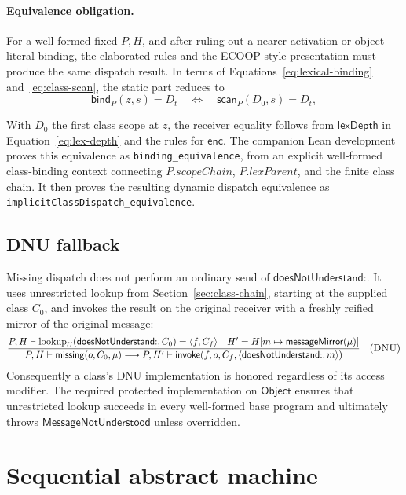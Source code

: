 \documentclass[11pt]{article}
\numberwithin{equation}{section}
\newcommand{\kw}[1]{\ensuremath{\mathsf{#1}}}
\newcommand{\Object}{\kw{Object}}
\newcommand{\lookup}{\mathop{\mathrm{lookup}}}
\newcommand{\kws}[1]{\ensuremath{\mathsf{#1\mathord{:}}}}
\newcommand{\dnu}{\kws{doesNotUnderstand}}
\newcommand{\rulelabel}[1]{\textsc{#1}}
\begin{document}
\paragraph{Equivalence obligation.}
For a well-formed fixed $P,H$, and after ruling out a nearer activation or
object-literal binding, the elaborated rules and the ECOOP-style presentation
must produce the same dispatch result.  In terms of
Equations~\eqref{eq:lexical-binding} and~\eqref{eq:class-scan}, the static part
reduces to
\begin{equation}\label{eq:binding-equivalence}
 \mathsf{bind}_P(z,s)=D_t
 \quad\Longleftrightarrow\quad
 \mathsf{scan}_P(D_0,s)=D_t,
\end{equation}
\begin{sloppypar}
With $D_0$ the first class scope at $z$, the receiver equality follows from
$\mathsf{lexDepth}$ in Equation~\eqref{eq:lex-depth} and the rules for
$\mathsf{enc}$.  The companion Lean development proves this equivalence as
\texttt{binding\_\allowbreak equivalence}, from an explicit well-formed class-binding
context connecting $P.\mathit{scopeChain}$, $P.\mathit{lexParent}$, and the
finite class chain.  It then proves the resulting dynamic dispatch
equivalence as
\texttt{implicit\allowbreak Class\allowbreak Dispatch\_\allowbreak equivalence}.
\end{sloppypar}

\subsection{DNU fallback}
\label{sec:dnu}

Missing dispatch does not perform an ordinary send of \dnu.  It uses
unrestricted lookup from Section~\ref{sec:class-chain}, starting at the supplied
class $C_0$, and invokes the result
on the original receiver with a freshly reified mirror of the original message:
\[
\dfrac{P,H\vdash\lookup_U(\dnu,C_0)=\langle f,C_f\rangle\quad
       H' = H[m\mapsto\mathsf{messageMirror}(\mu)]}
      {P,H\vdash\kw{missing}(o,C_0,\mu)
       \longrightarrow
       P,H'\vdash\kw{invoke}(f,o,C_f,\langle\dnu,m\rangle)}
\quad(\rulelabel{DNU})
\]
Consequently a class's DNU implementation is honored regardless of its access
modifier.  The required protected implementation on \Object{} ensures that
unrestricted lookup succeeds in every well-formed base program and ultimately
throws \kw{MessageNotUnderstood} unless overridden.

\section{Sequential abstract machine}
\label{sec:machine}
\end{document}

